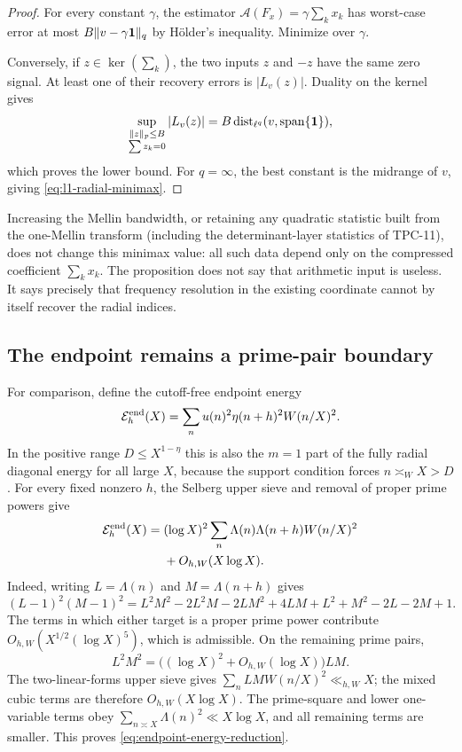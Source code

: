 \begin{proof}
For every constant $\gamma$, the estimator
$\mathcal A(F_x)=\gamma\sum_kx_k$ has worst-case error at most
$B\|v-\gamma\mathbf 1\|_q$ by H\"older's inequality.  Minimize over
$\gamma$.

Conversely, if $z\in\ker(\sum_k)$, the two inputs $z$ and $-z$ have the
same zero signal.  At least one of their recovery errors is
$|L_v(z)|$.  Duality on the kernel gives
\[
 \sup_{\substack{\|z\|_p\leq B\\\sum z_k=0}}|L_v(z)|
 =B\operatorname{dist}_{\ell^q}(v,\operatorname{span}\{\mathbf 1\}),
\]
which proves the lower bound.  For $q=\infty$, the best constant is the
midrange of $v$, giving \eqref{eq:l1-radial-minimax}.
\end{proof}

Increasing the Mellin bandwidth, or retaining any quadratic statistic
built from the one-Mellin transform (including the determinant-layer
statistics of TPC-11), does not change this
minimax value: all such data depend only on the compressed coefficient
$\sum_kx_k$.  The proposition does not say that arithmetic input is
useless.  It says precisely that frequency resolution in the existing
coordinate cannot by itself recover the radial indices.

\subsection{The endpoint remains a prime-pair boundary}

For comparison, define the cutoff-free endpoint energy
\begin{equation}
 \mathcal E^{\mathrm{end}}_{h}(X)=
 \sum_nu(n)^2\eta(n+h)^2W(n/X)^2.
 \label{eq:endpoint-energy}
\end{equation}
In the positive range $D\leq X^{1-\eta}$ this is also the $m=1$ part of
the fully radial diagonal energy for all large $X$, because the support
condition forces $n\asymp_WX>D$.
For every fixed nonzero $h$, the Selberg upper sieve and removal of proper
prime powers give
\begin{equation}
 \begin{aligned}
 \mathcal E^{\mathrm{end}}_{h}(X)
 ={}&(\log X)^2
 \sum_n\Lambda(n)\Lambda(n+h)W(n/X)^2\\
 &+O_{h,W}(X\log X).
 \end{aligned}
 \label{eq:endpoint-energy-reduction}
\end{equation}
Indeed, writing $L=\Lambda(n)$ and $M=\Lambda(n+h)$ gives
\[
 (L-1)^2(M-1)^2
 =L^2M^2-2L^2M-2LM^2+4LM+L^2+M^2-2L-2M+1.
\]
The terms in which either target is a proper prime power contribute
$O_{h,W}(X^{1/2}(\log X)^5)$, which is admissible.  On the remaining
prime pairs,
\[
 L^2M^2
 =\bigl((\log X)^2+O_{h,W}(\log X)\bigr)LM.
\]
The two-linear-forms upper sieve gives
$\sum_nLMW(n/X)^2\ll_{h,W}X$; the mixed cubic terms are therefore
$O_{h,W}(X\log X)$.  The prime-square and lower one-variable terms obey
$\sum_{n\asymp X}\Lambda(n)^2\ll X\log X$, and all remaining terms are
smaller.  This proves \eqref{eq:endpoint-energy-reduction}.

